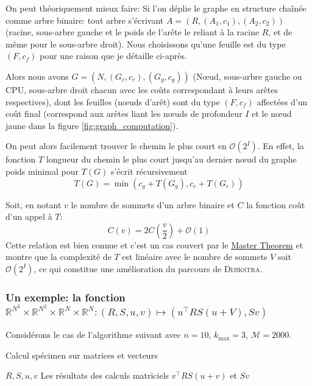 \documentclass[svgnames,dvipsnames,a4paper,10pt,french]{report}
\begin{document}
\begin{appendices}
On peut théoriquement mieux faire: Si l'on déplie le graphe en structure chaînée comme arbre binaire: tout arbre s'écrivant $A = (R, (A_1, c_1), (A_2, c_2))$ (racine, sous-arbre gauche et le poids de l'arête le reliant à la racine $R$, et de même pour le sous-arbre droit). Nous choisissons qu'une feuille est du type $(F, c_f)$ pour une raison que je détaille ci-après.

Alors nous avons $G = (N, (G_c, c_c), (G_g, c_g))$ (N\oe{}ud, sous-arbre gauche ou CPU, sous-arbre droit chacun avec les coûts correspondant à leurs arêtes respectives), dont les feuilles (n\oe{}uds d'arêt) sont du type $(F, c_f)$ affectées d'un coût final (correspond aux arêtes liant les n\oe{}uds de profondeur $I$ et le n\oe{}ud jaune dans la figure \ref{fig:graph_computation}).

On peut alors facilement trouver le chemin le plus court en $\mathcal{O}(2^I)$. En effet, la fonction $T$  \og longueur du chemin le plus court jusqu'au dernier n\oe{}ud du graphe \fg{} poids minimal pour $T(G)$ s'écrit récursivement
\begin{equation}
    T(G) = \min (c_g + T(G_g), c_c + T(G_c))
\end{equation}

Soit, en notant $v$ le nombre de sommets d'un arbre binaire et $C$ la fonction coût d'un appel à $T$:
\begin{equation}
    C(v) = 2C\left( \frac{v}{2} \right) + \mathcal{O}(1)
\end{equation}
Cette relation est bien connue et c'est un cas couvert par le \href{https://en.wikipedia.org/wiki/Master_theorem_(analysis_of_algorithms)}{Master Theorem} et montre que la complexité de $T$ est linéaire avec le nombre de sommets $V$ soit $\mathcal{O}(2^I)$, ce qui constitue une amélioration du parcours de \textsc{Dijikstra}. 

\subsubsection{Un exemple: la fonction $\mathbb{R}^{N^2} \times \mathbb{R}^{N^2} \times \mathbb{R}^N \times \mathbb{R}^N: (R, S, u, v) \mapsto (u^\intercal RS(u+V), Sv)$}
Considérons le cas de l'algorithme suivant avec $n=10$, $k_{\text{max}} = 3$, $\mathcal{M}=2000$.


\begin{algorithm}[H]
\caption{Calcul spécimen sur matrices et vecteurs}
\label{alg:calc_ABuv}
\begin{algorithmic}[1]
\Require $R,S,  u, v$
\Ensure Les résultats des calculs matriciels $v^\intercal RS (u+v)$ et $ Sv$


\end{algorithmic}
\end{algorithm}
\end{appendices}
\end{document}
